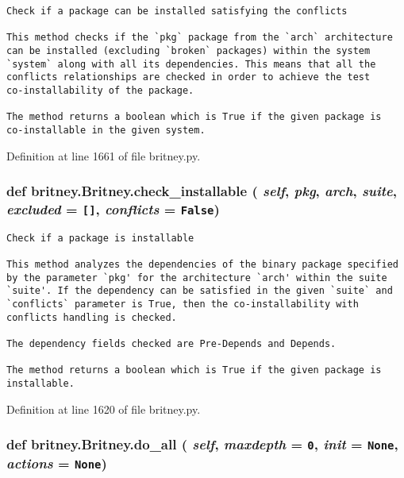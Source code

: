 \footnotesize\begin{verbatim}Check if a package can be installed satisfying the conflicts

This method checks if the `pkg` package from the `arch` architecture
can be installed (excluding `broken` packages) within the system
`system` along with all its dependencies. This means that all the
conflicts relationships are checked in order to achieve the test
co-installability of the package.

The method returns a boolean which is True if the given package is
co-installable in the given system.
\end{verbatim}
\normalsize
 

Definition at line 1661 of file britney.py.
\subsubsection{\setlength{\rightskip}{0pt plus 5cm}def britney.Britney.check\_\-installable ( {\em self},  {\em pkg},  {\em arch},  {\em suite},  {\em excluded} = {\tt []},  {\em conflicts} = {\tt False})}\label{classbritney_1_1Britney_4c06ddd116a40752c62d4395e92a97df}




\footnotesize\begin{verbatim}Check if a package is installable

This method analyzes the dependencies of the binary package specified
by the parameter `pkg' for the architecture `arch' within the suite
`suite'. If the dependency can be satisfied in the given `suite` and
`conflicts` parameter is True, then the co-installability with 
conflicts handling is checked.

The dependency fields checked are Pre-Depends and Depends.

The method returns a boolean which is True if the given package is
installable.
\end{verbatim}
\normalsize
 

Definition at line 1620 of file britney.py.
\subsubsection{\setlength{\rightskip}{0pt plus 5cm}def britney.Britney.do\_\-all ( {\em self},  {\em maxdepth} = {\tt 0},  {\em init} = {\tt None},  {\em actions} = {\tt None})}\label{classbritney_1_1Britney_3ef9b6f600eac492fc5aa4b31638198f}




